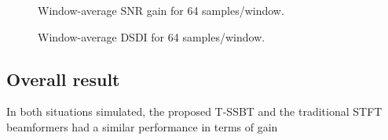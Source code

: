 

%	
%	

\begin{figure}[H]
\centering

\caption{Window-average SNR gain for 64 samples/window.}
\label{fig:lineplot_gain_64}
\end{figure}

\begin{figure}[H]
	\centering
	
	\caption{Window-average DSDI for 64 samples/window.}
	\label{fig:lineplot_dsdi_64}
\end{figure}

\subsection{Overall result}

In both situations simulated, the proposed T-SSBT and the traditional STFT beamformers had a similar performance in terms of gain